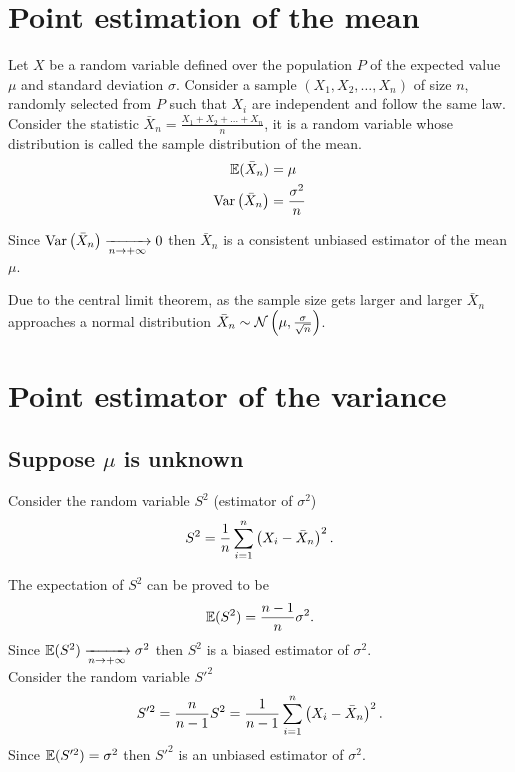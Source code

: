 \documentclass{report}
\begin{document}
\section{Point estimation of the mean}
Let $X$ be a random variable defined over the population $P$ of the expected value $\mu$ and standard deviation $\sigma$. Consider a sample $(X_1,X_2,\dots,X_n)$ of size $n$, randomly selected from $P$ such that $X_i$ are independent and follow the same law.\\

Consider the statistic $\bar{X}_n = \frac{X_1+X_2+\dots+X_n}{n}$, it is a random variable whose distribution is called the sample distribution of the mean.
\begin{align*}
	\mathbb{E}(\bar{X}_n)  & = \mu                \\
	\mathrm{Var}\left( \bar{X}_n \right) & = \frac{\sigma^2}{n}
\end{align*}

Since $\mathrm{Var}\left( \bar{X}_n \right)\xrightarrow[n\to+\infty]{}0$ then $\bar{X}_n$ is a consistent unbiased estimator of the mean $\mu$.

Due to the central limit theorem, as the sample size gets larger and larger $\bar{X}_n$ approaches a normal distribution $\bar{X}_n\sim\mathcal{N}\left(\mu,\frac{\sigma}{\sqrt{n}}\right)$.

\section{Point estimator of the variance}

\subsection{Suppose $\mu$ is unknown}

Consider the random variable $S^2$ (estimator of $\sigma^2$)
\[
	S^2 = \frac{1}{n}\sum_{i=1}^n \left(X_i-\bar{X}_n\right)^2
	.\]

The expectation of $S^2$ can be proved to be
\[
	\mathbb{E}(S^2)=\frac{n-1}{n}\sigma^2
	.\]
Since $\mathbb{E}(S^2)\xrightarrow[n\to+\infty]{}\sigma^2$ then $S^2$ is a biased estimator of $\sigma^2$.\\

Consider the random variable $S'^2$
\[
	S'^2 = \frac{n}{n-1}S^2 = \frac{1}{n-1}\sum_{i=1}^n \left(X_i-\bar{X}_n\right)^2
	.\]
Since $\mathbb{E}(S'^2)=\sigma^2$ then $S'^2$ is an unbiased estimator of $\sigma^2$.\\
\end{document}
